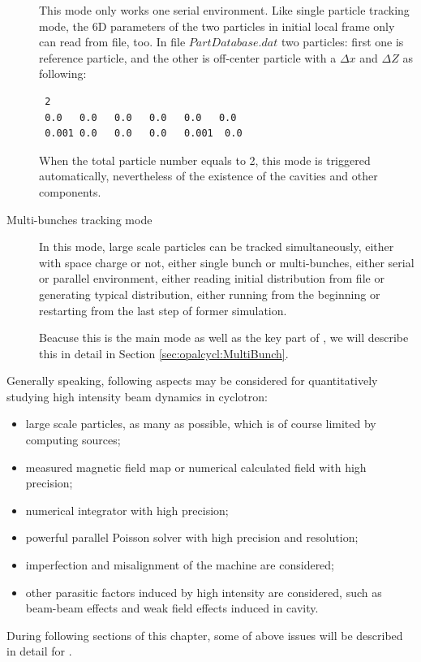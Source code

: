 \begin{description}
  This mode only works one serial environment. Like single particle tracking mode, 
  the 6D parameters of the two particles in initial local frame only can read from file, too.
  In file $PartDatabase.dat$ two particles: first one is reference particle,
  and the other is off-center particle with a $\Delta x$ and $\Delta Z$ as following:
\begin{verbatim}
 2
 0.0   0.0   0.0   0.0   0.0   0.0  
 0.001 0.0   0.0   0.0   0.001  0.0    
\end{verbatim}

When the total particle number equals to 2, this mode is triggered automatically,
nevertheless of the existence of the cavities and other components.

\item[Multi-bunches tracking mode]

  In this mode, large scale particles can be tracked simultaneously, either with space charge or not, 
  either single bunch or multi-bunches, either serial or parallel environment, 
  either reading initial distribution from file or generating typical distribution,  
  either running from the beginning or restarting from the last step of former simulation.

  Beacuse this is the main mode as well as the key part of \opalcycl, 
  we will describe this in detail in Section \ref{sec:opalcycl:MultiBunch}.

\end{description}  
  
Generally speaking, following aspects may be considered for quantitatively studying high intensity beam dynamics in cyclotron:
  \begin{itemize}
  \item large scale particles, as many as possible, which is of course limited by computing sources;
  \item measured magnetic field map or numerical calculated field with high precision;
  \item numerical integrator with high precision;
  \item powerful parallel Poisson solver with high precision and resolution;
  \item imperfection and misalignment of the machine are considered;
  \item other parasitic factors induced by high intensity are considered, such as beam-beam effects and
    weak field effects induced in cavity. 
  \end{itemize}
  During following sections of this chapter, some of above issues will be described in detail for \opalcycl.

